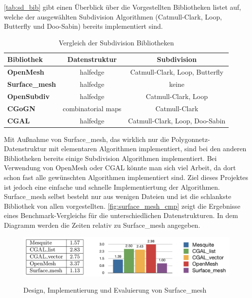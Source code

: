 \autoref{tab:sd_bib} gibt einen Überblick über die Vorgestellten Bibliotheken listet auf, welche der ausgewählten Subdivision Algorithmen
(Catmull-Clark, Loop, Butterfly und Doo-Sabin) bereits implementiert sind.

\begin{table}
\caption{Vergleich der Subdivision Bibliotheken}
\center
\begin{tabular}{l|c|c}
\textbf{Bibliothek} & \textbf{Datenstruktur} & \textbf{Subdivision}\\
\hline
\textbf{OpenMesh} & halfedge & Catmull-Clark, Loop, Butterfly\\
\textbf{Surface\_mesh} & halfedge & keine\\
\textbf{OpenSubdiv} & halfedge & Catmull-Clark, Loop\\
\textbf{CGoGN} & combinatorial maps & Catmull-Clark\\
\textbf{\acs{CGAL}} & halfedge & Catmull-Clark, Loop, Doo-Sabin\\
\end{tabular}
\label{tab:sd_bib}
\end{table}

Mit Außnahme von Surface\_mesh, das wirklich nur die Polygonnetz-Datenstruktur mit elementaren Algorithmen implementiert, sind bei den anderen Bibliotheken bereits
einige Subdivision Algorithmen implementiert.
Bei Verwendung von OpenMesh oder CGAL könnte man sich viel Arbeit, da dort schon fast alle gewünschten Algorithmen implementiert sind.
Ziel dieses Projektes ist jedoch eine einfache und schnelle Implementiertung der Algorithmen.
Surface\_mesh selbst besteht nur aus wenigen Dateien und ist die schlankste Bibliothek von allen vorgestellten.
\autoref{fig:surface_mesh_cmp} zeigt die Ergebnisse eines Benchmark-Vergleichs für die unterschiedlichen Datenstrukturen.
In dem Diagramm werden die Zeiten relativ zu Surface\_mesh angegeben.

\begin{figure}
  \caption{Design, Implementierung und Evaluierung von Surface\_mesh \cite{Sieger.}}
  \centering
  \includegraphics[width=1.0\textwidth]{content/media/surface_mesh_cmp}
  \label{fig:surface_mesh_cmp}
\end{figure}

